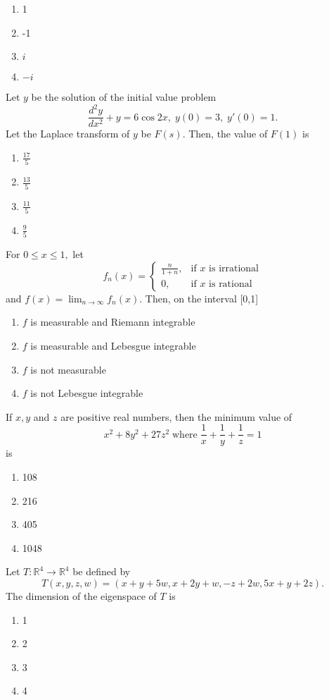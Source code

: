 \begin{enumerate}
    \item 1
    \item -1
    \item $i$
    \item $-i$
\end{enumerate}
\item Let $y$ be the solution of the initial value problem $$\frac{d^2y}{dx^2}+y=6\cos{2x}, \; y(0)=3, \; y'(0)=1.$$ Let the Laplace transform of $y$ be $F(s)$. Then, the value of $F(1)$ is
\begin{enumerate}
    \item $\frac{17}{5}$
    \item $\frac{13}{5}$
    \item $\frac{11}{5}$
    \item $\frac{9}{5}$
\end{enumerate}
\item For $0\leq x\leq 1,$ let $$f_n(x) = 
\begin{cases} 
\frac{n}{1+n}, & \text{if } x \text{ is irrational} \\
0, & \text{if } x \text{ is rational}
\end{cases}$$ and $f(x)=\lim_{n \to \infty}f_n(x).$ Then, on the interval [0,1]
\begin{enumerate}
    \item $f$ is measurable and Riemann integrable
    \item $f$ is measurable and Lebesgue integrable
    \item $f$ is not measurable
    \item $f$ is not Lebesgue integrable
\end{enumerate}
\item If $x, y$ and $z$ are positive real numbers, then the minimum value of $$x^2+8y^2+27z^2 \; \text{where} \; \frac{1}{x}+\frac{1}{y}+\frac{1}{z}=1$$ is
\begin{enumerate}
    \item 108
    \item 216
    \item 405
    \item 1048
\end{enumerate}
\item Let $T:\mathbb{R}^4 \to \mathbb{R}^4$ be defined by $$T(x,y,z,w)=(x+y+5w,x+2y+w,-z+2w,5x+y+2z).$$ The dimension of the eigenspace of $T$ is
\begin{enumerate}
    \item 1
    \item 2
    \item 3
    \item 4
\end{enumerate}
